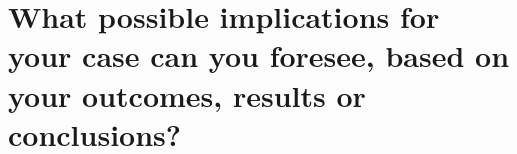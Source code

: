 \section{What possible implications for your case can you foresee, based on your outcomes, results or conclusions?}

